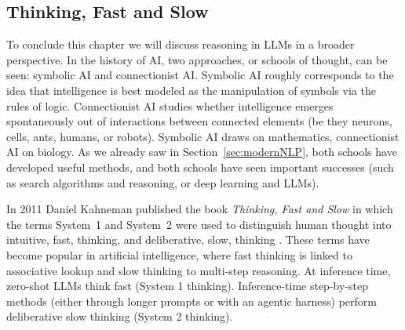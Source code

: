 
\subsection{Thinking, Fast and Slow}
\label{sec:fast-and-slow}
To conclude this chapter we will discuss reasoning in LLMs in a broader perspective. In the history of AI, two approaches, or schools of thought, can be seen: symbolic AI and connectionist AI. Symbolic AI roughly corresponds to the idea that intelligence is best modeled as the manipulation of symbols via the rules of logic. Connectionist AI studies whether intelligence emerges spontaneously out of interactions between connected elements (be they neurons, cells, ants, humans, or robots). Symbolic AI draws on mathematics, connectionist AI on biology. As we already saw in Section~\ref{sec:modernNLP}, both schools have developed useful methods, and both schools have seen important successes (such as search algorithms and reasoning, or deep learning and LLMs). 

In 2011 Daniel Kahneman published the book {\em   Thinking, Fast and Slow} %
in which the terms System~1  and System~2
were used to distinguish  human thought into intuitive, fast, thinking, and deliberative,
slow, thinking \citep{kahneman2011thinking}. These terms have become 
popular in artificial intelligence, where fast thinking is linked to associative lookup and slow thinking to multi-step reasoning. At inference time,  zero-shot LLMs think fast (System 1 thinking).
Inference-time step-by-step methods (either through longer prompts or with an agentic harness) perform deliberative
slow thinking
(System 2 thinking). %

